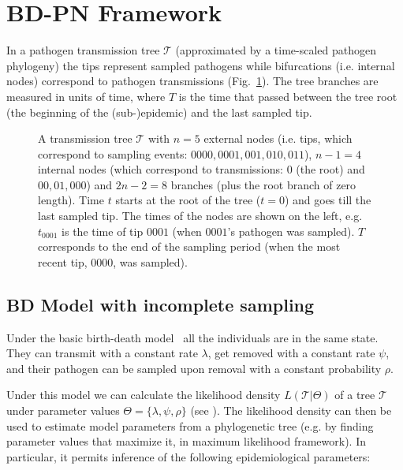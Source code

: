 \documentclass[a4paper,10pt]{article}
\begin{document}
\section{BD-PN Framework}
In a pathogen transmission tree $\mathscr{T}$ (approximated by a time-scaled pathogen phylogeny) the tips represent sampled pathogens %
while bifurcations (i.e. internal nodes) correspond to pathogen transmissions (Fig.~\ref{fig:tt}). The tree branches are measured in units of time, where $T$ is the time that passed between the tree root (the beginning of the (sub-)epidemic) and the last sampled tip. 


\begin{figure}[tbhp]
\centering 

\caption{A transmission tree $\mathscr{T}$ with $n=5$ external nodes (i.e. tips, which correspond to sampling events: $0000, 0001, 001, 010, 011$), $n-1=4$ internal nodes (which correspond to transmissions: $0$ (the root) and $00, 01, 000$) and $2n - 2 = 8$ branches (plus the root branch of zero length). %
Time $t$ starts at the root of the tree ($t=0$) and goes till the last sampled tip. The times of the nodes are shown on the left, e.g. $t_{0001}$ is the time of tip $0001$ (when $0001$'s pathogen was sampled). $T$ corresponds to the end of the sampling period (when the most recent tip, $0000$, was sampled).}
\label{fig:tt} 
\end{figure}

\subsection{BD Model with incomplete sampling}
Under the basic birth-death model~\citep{Stadler2009} all the individuals are in the same state. They can transmit with a constant rate $\lambda$, get removed with a constant rate $\psi$, and their pathogen can be sampled upon removal with a constant probability $\rho$. 

Under this model we can calculate the likelihood density $L(\mathscr{T}|\Theta)$ of a tree $\mathscr{T}$ under parameter values $\Theta = \{\lambda, \psi, \rho\}$ (see ). The likelihood density can then be used to estimate model parameters from a phylogenetic tree (e.g. by finding parameter values that maximize it, in maximum likelihood framework). In particular, it permits inference of the following epidemiological parameters: 
\end{document}
